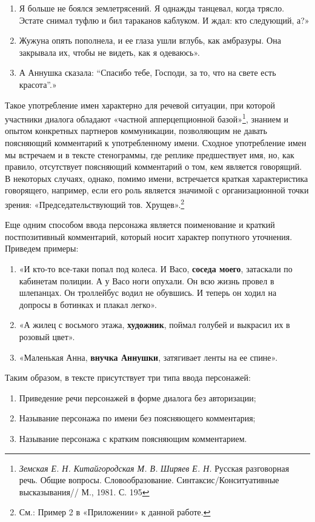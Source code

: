 \documentclass{kursa4}
\begin{document}
        \begin{enumerate}
          \item Я больше не боялся землетрясений. Я однажды танцевал, когда трясло. Эстате снимал туфлю и бил тараканов каблуком. И ждал: кто следующий, а?» \item Жужуна опять пополнела, и ее глаза ушли вглубь, как амбразуры. Она закрывала их, чтобы не видеть, как я одеваюсь». 
          \item А Аннушка сказала: “Спасибо тебе, Господи, за то, что на свете есть красота”.» \end{enumerate}

        Такое употребление имен характерно для речевой ситуации, при которой участники диалога обладают «частной апперцепционной базой»\footnote{\textit{Земская Е. Н. Китайгородская М. В. }\textit{Ширяев Е. Н. }Русская разговорная речь. Общие вопросы. Словообразование. Синтаксис/Конситуативные высказывания// М., 1981. С. 195}, знанием и опытом конкретных партнеров коммуникации, позволяющим не давать поясняющий комментарий к употребленному имени. Сходное употребление имен мы встречаем и в тексте стенограммы, где реплике предшествует имя, но, как правило, отсутствует поясняющий комментарий о том, кем является говорящий. В некоторых случаях, однако, помимо имени, встречается краткая характеристика говорящего, например, если его роль является значимой с организационной точки зрения: «Председательствующий тов. Хрущев».\footnote{См.: Пример 2 в «Приложении» к данной работе.} 

        Еще одним способом ввода персонажа является поименование и краткий постпозитивный комментарий, который носит характер попутного уточнения. Приведем примеры: \begin{enumerate}
          \item «И кто-то все-таки попал под колеса. И Васо, \textbf{соседа моего}, затаскали по кабинетам полиции. А у Васо ноги опухали. Он всю жизнь провел в шлепанцах. Он троллейбус водил не обувшись. И теперь он ходил на допросы в ботинках и плакал легко». \item «А жилец с восьмого этажа, \textbf{художник}, поймал голубей и выкрасил их в розовый цвет». \item «Маленькая Анна, \textbf{внучка Аннушки}, затягивает ленты на ее спине». \end{enumerate}

        Таким образом, в тексте присутствует три типа ввода персонажей: 

        \begin{enumerate}
          \item Приведение речи персонажей в форме диалога без авторизации; \item Называние персонажа по имени без поясняющего комментария; \item Называние персонажа с кратким поясняющим комментарием. \end{enumerate}
\end{document}
